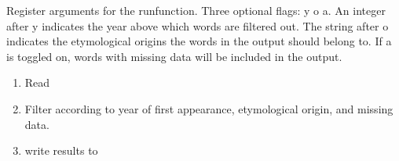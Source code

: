 \documentclass[letterpaper,10pt,english]{sphinxmanual}
\begin{document}
{{{{\begin{fulllineitems}
\end{fulllineitems}


\begin{fulllineitems}
\label{\detokenize{filter:gerstnerhungariancommands.filter.register}}
\pysigstartsignatures
{}
\pysigstopsignatures
\sphinxAtStartPar
Register arguments for the run\sphinxhyphen{}function. Three optional flags: \sphinxhyphen{}y \sphinxhyphen{}o \sphinxhyphen{}a.
An integer after \sphinxhyphen{}y indicates the year above which words are filtered out.
The string after \sphinxhyphen{}o indicates the etymological origins the words in the
output should belong to. If \sphinxhyphen{}a is toggled on, words with missing data
will be included in the output.

\end{fulllineitems}


\begin{fulllineitems}
\label{\detokenize{filter:gerstnerhungariancommands.filter.run}}
\pysigstartsignatures
{}
\pysigstopsignatures\begin{enumerate}
%
\item {} 
\sphinxAtStartPar
Read 

\item {} 
\sphinxAtStartPar
Filter according to year of first appearance, etymological origin,
and missing data.

\item {} 
\sphinxAtStartPar
write results to 

\end{enumerate}

\end{fulllineitems}



}}}}
\end{document}
